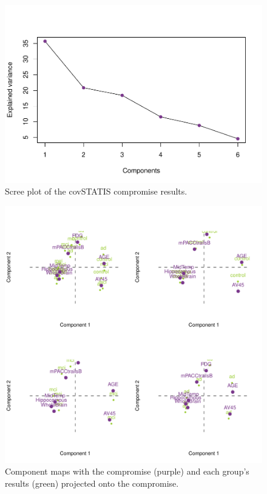 \documentclass[man,floatsintext]{apa6}
\theoremstyle{definition}
\theoremstyle{definition}
\theoremstyle{definition}
\theoremstyle{remark}
\begin{document}
\begin{figure}[H]

{\centering \includegraphics{2_RMarkdown_APA_Manuscript_files/figure-latex/scree-1} 

}

\caption{Scree plot of the covSTATIS compromise results.}\label{fig:scree}
\end{figure}

\begin{figure}[H]

{\centering \includegraphics{2_RMarkdown_APA_Manuscript_files/figure-latex/unnamed-chunk-1-1} 

}

\caption{Component maps with the compromise (purple) and each group's results (green) projected onto the compromise.}\label{fig:unnamed-chunk-1}
\end{figure}
\end{document}

